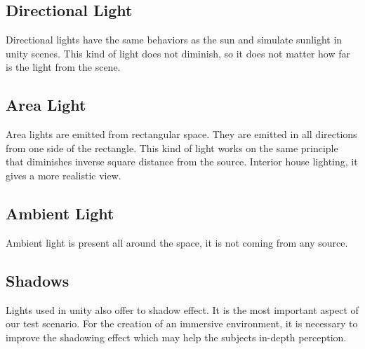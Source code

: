 \subsection{Directional Light}
Directional lights have the same behaviors as the sun and simulate sunlight in unity scenes. This kind of light does not diminish, so it does not matter how far is the light from the scene.

\subsection{Area Light}
Area lights are emitted from rectangular space. They are emitted in all directions from one side of the rectangle. This kind of light works on the same principle that diminishes inverse square distance from the source. Interior house lighting, it gives a more realistic view.

\subsection{Ambient Light}
Ambient light is present all around the space, it is not coming from any source.

\subsection{Shadows}
Lights used in unity also offer to shadow effect. It is the most important aspect of our test scenario. For the creation of an immersive environment, it is necessary to improve the shadowing effect which may help the subjects in-depth perception.



